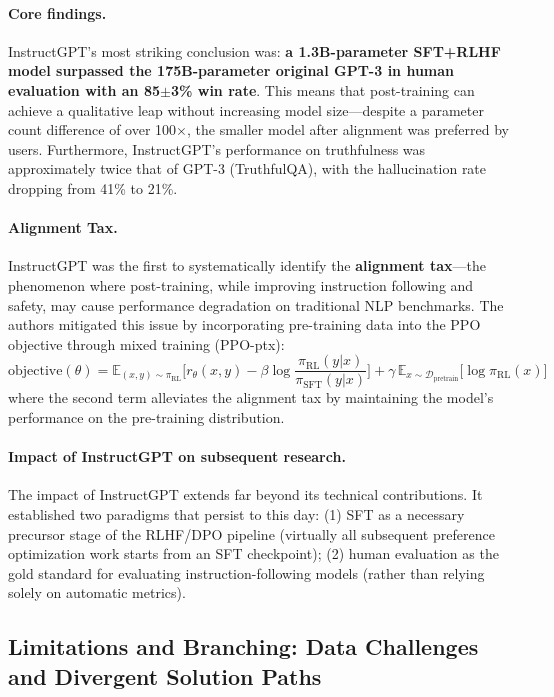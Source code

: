 \paragraph{Core findings.}
InstructGPT's most striking conclusion was:
\textbf{a 1.3B-parameter SFT+RLHF model surpassed the 175B-parameter original GPT-3 in human evaluation with an 85$\pm$3\% win rate}.
This means that post-training can achieve a qualitative leap without increasing model size---despite
a parameter count difference of over 100$\times$, the smaller model after alignment was preferred by users.
Furthermore, InstructGPT's performance on truthfulness was approximately twice that of GPT-3 (TruthfulQA),
with the hallucination rate dropping from 41\% to 21\%.

\paragraph{Alignment Tax.}
InstructGPT was the first to systematically identify the \textbf{alignment tax}---the
phenomenon where post-training, while improving instruction following and safety,
may cause performance degradation on traditional NLP benchmarks.
The authors mitigated this issue by incorporating pre-training data into the PPO objective through mixed training (PPO-ptx):
\[
  \text{objective}(\theta) =
    \mathbb{E}_{(x,y) \sim \pi_{\text{RL}}} \big[ r_\theta(x,y) - \beta \log \frac{\pi_{\text{RL}}(y|x)}{\pi_{\text{SFT}}(y|x)} \big]
    + \gamma \, \mathbb{E}_{x \sim \mathcal{D}_{\text{pretrain}}} \big[ \log \pi_{\text{RL}}(x) \big]
\]
where the second term alleviates the alignment tax by maintaining the model's performance on the pre-training distribution.

\paragraph{Impact of InstructGPT on subsequent research.}
The impact of InstructGPT extends far beyond its technical contributions.
It established two paradigms that persist to this day:
(1) SFT as a necessary precursor stage of the RLHF/DPO pipeline
(virtually all subsequent preference optimization work starts from an SFT checkpoint);
(2) human evaluation as the gold standard for evaluating instruction-following models
(rather than relying solely on automatic metrics).


\subsection{Limitations and Branching: Data Challenges and Divergent Solution Paths}
\label{sec:t1-branching}

